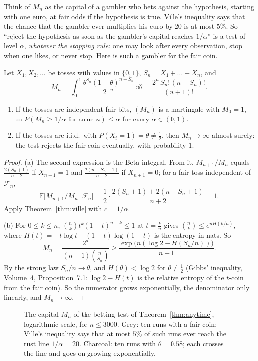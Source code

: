 Think of $M_n$ as the capital of a gambler who bets against the hypothesis, starting with one euro, at fair odds if the hypothesis is true. Ville's inequality says that the chance that the
gambler ever multiplies his euro by $20$ is at most $5\%$. So ``reject the hypothesis as soon as the gambler's capital reaches $1/\alpha$'' is a test of level $\alpha$, \emph{whatever the stopping rule}: one may look
after every observation, stop when one likes, or never stop. Here is such a gambler for the fair coin.

\begin{theorem}\label{thm:anytime}
Let $X_1,X_2,\dots$ be tosses with values in $\{0,1\}$, $S_n=X_1+\dots+X_n$, and
\[
M_n=\int_0^1\frac{\theta^{S_n}(1-\theta)^{n-S_n}}{2^{-n}}\,\dd\theta=\frac{2^n\,S_n!\,(n-S_n)!}{(n+1)!}.
\]
\begin{enumerate}[label=(\alph*)]
\item If the tosses are independent fair bits, $(M_n)$ is a martingale with $M_0=1$, so $P(M_n\ge1/\alpha\text{ for some }n)\le\alpha$ for every $\alpha\in(0,1)$.
\item If the tosses are i.i.d.\ with $P(X_i=1)=\theta\neq\frac12$, then $M_n\to\infty$ almost surely: the test rejects the fair coin eventually, with probability $1$.
\end{enumerate}
\end{theorem}
\begin{proof}
(a) The second expression is the Beta integral. From it, $M_{n+1}/M_n$ equals $\frac{2(S_n+1)}{n+2}$ if $X_{n+1}=1$ and $\frac{2(n-S_n+1)}{n+2}$ if $X_{n+1}=0$; for a fair toss independent of $\mathcal F_n$,
\[
\mathbb E\bigl[M_{n+1}/M_n\,\big|\,\mathcal F_n\bigr]=\frac12\cdot\frac{2(S_n+1)+2(n-S_n+1)}{n+2}=1.
\]
Apply Theorem~\ref{thm:ville} with $c=1/\alpha$.

(b) For $0\le k\le n$, $\binom nkt^k(1-t)^{n-k}\le1$ at $t=\frac kn$ gives $\binom nk\le e^{nH(k/n)}$, where $H(t)=-t\log t-(1-t)\log(1-t)$ is the entropy in nats. So
\[
M_n=\frac{2^n}{(n+1)\binom n{S_n}}\ge\frac{\exp\bigl(n(\log2-H(S_n/n))\bigr)}{n+1}.
\]
By the strong law $S_n/n\to\theta$, and $H(\theta)<\log2$ for $\theta\neq\frac12$ (Gibbs' inequality, Volume~4, Proposition~7.1: $\log2-H(t)$ is the relative entropy of the $t$-coin from the fair coin). So the numerator grows exponentially, the denominator only linearly,
and $M_n\to\infty$.
\end{proof}

\begin{figure}[ht]
\centering{}
\caption{The capital $M_n$ of the betting test of Theorem~\ref{thm:anytime}, logarithmic scale, for $n\le3000$. Grey: ten runs with a fair coin; Ville's inequality says that at most $5\%$ of such runs ever reach the
rust line $1/\alpha=20$. Charcoal: ten runs with $\theta=0.58$; each crosses the line and goes on growing exponentially.}
\label{fig:ville}
\end{figure}

